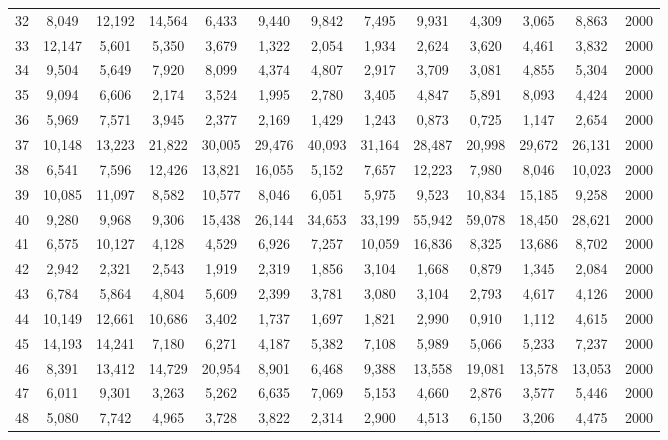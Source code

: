 {\begin{longtable}{ >{\footnotesize}ccccccccccccc}
32  & 8,049  & 12,192 & 14,564 & 6,433  & 9,440  & 9,842  & 7,495  & 9,931  & 4,309  & 3,065  & 8,863  & 2000 \\
33  & 12,147 & 5,601  & 5,350  & 3,679  & 1,322  & 2,054  & 1,934  & 2,624  & 3,620  & 4,461  & 3,832  & 2000 \\
34  & 9,504  & 5,649  & 7,920  & 8,099  & 4,374  & 4,807  & 2,917  & 3,709  & 3,081  & 4,855  & 5,304  & 2000 \\
35  & 9,094  & 6,606  & 2,174  & 3,524  & 1,995  & 2,780  & 3,405  & 4,847  & 5,891  & 8,093  & 4,424  & 2000 \\
36  & 5,969  & 7,571  & 3,945  & 2,377  & 2,169  & 1,429  & 1,243  & 0,873  & 0,725  & 1,147  & 2,654  & 2000 \\
37  & 10,148 & 13,223 & 21,822 & 30,005 & 29,476 & 40,093 & 31,164 & 28,487 & 20,998 & 29,672 & 26,131 & 2000 \\
38  & 6,541  & 7,596  & 12,426 & 13,821 & 16,055 & 5,152  & 7,657  & 12,223 & 7,980  & 8,046  & 10,023 & 2000 \\
39  & 10,085 & 11,097 & 8,582  & 10,577 & 8,046  & 6,051  & 5,975  & 9,523  & 10,834 & 15,185 & 9,258  & 2000 \\
40  & 9,280  & 9,968  & 9,306  & 15,438 & 26,144 & 34,653 & 33,199 & 55,942 & 59,078 & 18,450 & 28,621 & 2000 \\
41  & 6,575  & 10,127 & 4,128  & 4,529  & 6,926  & 7,257  & 10,059 & 16,836 & 8,325  & 13,686 & 8,702  & 2000 \\
42  & 2,942  & 2,321  & 2,543  & 1,919  & 2,319  & 1,856  & 3,104  & 1,668  & 0,879  & 1,345  & 2,084  & 2000 \\
43  & 6,784  & 5,864  & 4,804  & 5,609  & 2,399  & 3,781  & 3,080  & 3,104  & 2,793  & 4,617  & 4,126  & 2000 \\
44  & 10,149 & 12,661 & 10,686 & 3,402  & 1,737  & 1,697  & 1,821  & 2,990  & 0,910  & 1,112  & 4,615  & 2000 \\
45  & 14,193 & 14,241 & 7,180  & 6,271  & 4,187  & 5,382  & 7,108  & 5,989  & 5,066  & 5,233  & 7,237  & 2000 \\
46  & 8,391  & 13,412 & 14,729 & 20,954 & 8,901  & 6,468  & 9,388  & 13,558 & 19,081 & 13,578 & 13,053 & 2000 \\
47  & 6,011  & 9,301  & 3,263  & 5,262  & 6,635  & 7,069  & 5,153  & 4,660  & 2,876  & 3,577  & 5,446  & 2000 \\
48  & 5,080  & 7,742  & 4,965  & 3,728  & 3,822  & 2,314  & 2,900  & 4,513  & 6,150  & 3,206  & 4,475  & 2000 \\

\end{longtable}}

